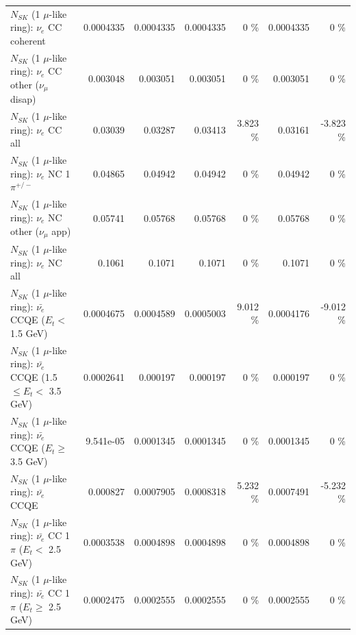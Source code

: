 \begin{table}
\begin{tabular}{| l | r | r | r  r | r  r |}
                               $N_{SK}$ (1 $\mu$-like ring): $\nu_e$ CC coherent &       0.0004335 &       0.0004335 &       0.0004335 &        0 \%  &       0.0004335 &        0 \%  \\ 
                $N_{SK}$ (1 $\mu$-like ring): $\nu_e$ CC other ($\nu_\mu$ disap) &        0.003048 &        0.003051 &        0.003051 &        0 \%  &        0.003051 &        0 \%  \\ 
                                  $N_{SK}$ (1 $\mu$-like ring): $\nu_{e}$ CC all &         0.03039 &         0.03287 &         0.03413 &    3.823 \%  &         0.03161 &   -3.823 \%  \\ 
\hline
                           $N_{SK}$ (1 $\mu$-like ring): $\nu_e$ NC 1$\pi^{+/-}$ &         0.04865 &         0.04942 &         0.04942 &        0 \%  &         0.04942 &        0 \%  \\ 
                  $N_{SK}$ (1 $\mu$-like ring): $\nu_e$ NC other ($\nu_\mu$ app) &         0.05741 &         0.05768 &         0.05768 &        0 \%  &         0.05768 &        0 \%  \\ 
                                  $N_{SK}$ (1 $\mu$-like ring): $\nu_{e}$ NC all &          0.1061 &          0.1071 &          0.1071 &        0 \%  &          0.1071 &        0 \%  \\ 
\hline
\hline
\hline
            $N_{SK}$ (1 $\mu$-like ring): $\bar{\nu_e}$ CCQE ($E_{t} <$ 1.5 GeV) &       0.0004675 &       0.0004589 &       0.0005003 &    9.012 \%  &       0.0004176 &   -9.012 \%  \\ 
   $N_{SK}$ (1 $\mu$-like ring): $\bar{\nu_e}$ CCQE (1.5 $\leq E_{t} <$ 3.5 GeV) &       0.0002641 &        0.000197 &        0.000197 &        0 \%  &        0.000197 &        0 \%  \\ 
         $N_{SK}$ (1 $\mu$-like ring): $\bar{\nu_e}$ CCQE ($E_{t} \geq$ 3.5 GeV) &       9.541e-05 &       0.0001345 &       0.0001345 &        0 \%  &       0.0001345 &        0 \%  \\ 
\hline
                                $N_{SK}$ (1 $\mu$-like ring): $\bar{\nu_e}$ CCQE &        0.000827 &       0.0007905 &       0.0008318 &    5.232 \%  &       0.0007491 &   -5.232 \%  \\ 
\hline
       $N_{SK}$ (1 $\mu$-like ring): $\bar{\nu_e}$ CC 1$\pi$ ($E_{t} <$ 2.5 GeV) &       0.0003538 &       0.0004898 &       0.0004898 &        0 \%  &       0.0004898 &        0 \%  \\ 
    $N_{SK}$ (1 $\mu$-like ring): $\bar{\nu_e}$ CC 1$\pi$ ($E_{t} \geq$ 2.5 GeV) &       0.0002475 &       0.0002555 &       0.0002555 &        0 \%  &       0.0002555 &        0 \%  \\ 

\end{tabular}
\end{table}
